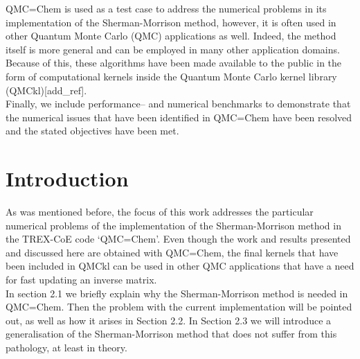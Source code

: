 \documentclass[11pt]{article}
\numberwithin{figure}{section}
\numberwithin{table}{section}
\begin{document}
      QMC=Chem is used as a test case to address the numerical problems in its implementation of the Sherman-Morrison method, however, it is often used in other Quantum Monte Carlo (QMC) applications as well. Indeed, the method itself is more general and can be employed in many other application domains. Because of this, these algorithms have been made available to the public in the form of computational kernels inside the Quantum Monte Carlo kernel library (QMCkl)[add\_ref].\\
      
      Finally, we include performance-- and numerical benchmarks to demonstrate that the numerical issues that have been identified in QMC=Chem have been resolved and the stated objectives have been met.

  \section{Introduction}
	
      As was mentioned before, the focus of this work addresses the particular numerical problems of the implementation of the Sherman-Morrison method in the TREX-CoE code `QMC=Chem'. Even though the work and results presented and discussed here are obtained with QMC=Chem, the final kernels that have been included in QMCkl can be used in other QMC applications that have a need for fast updating an inverse matrix.\\
      
        In section 2.1 we briefly explain why the Sherman-Morrison method is needed in QMC=Chem. Then the problem with the current implementation will be pointed out, as well as how it arises in Section 2.2. In Section 2.3 we will introduce a generalisation of the Sherman-Morrison method that does not suffer from this pathology, at least in theory.
	
\end{document}
